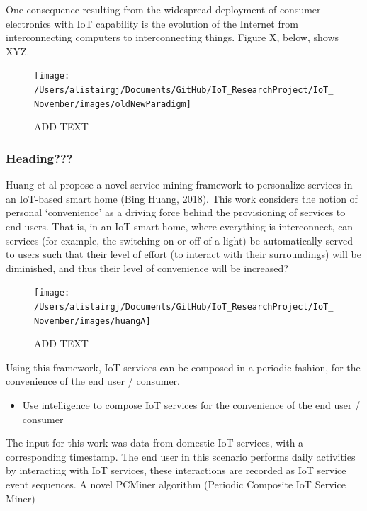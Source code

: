 \documentclass[11pt,]{article}
\providecommand{\tightlist}{%
  \setlength{\itemsep}{0pt}\setlength{\parskip}{0pt}}
\begin{document}
One consequence resulting from the widespread deployment of consumer
electronics with IoT capability is the evolution of the Internet from
interconnecting computers to interconnecting things. Figure X, below,
shows XYZ.

\begin{figure}[H]

{\centering \texttt{[image: /Users/alistairgj/Documents/GitHub/IoT\_ResearchProject/IoT\_November/images/oldNewParadigm]} 

}

\caption{ADD TEXT}\label{fig:unnamed-chunk-9}
\end{figure}

\hypertarget{heading}{%
\subsubsection{Heading???}\label{heading}}

Huang et al propose a novel service mining framework to personalize
services in an IoT-based smart home (Bing Huang, 2018). This work
considers the notion of personal `convenience' as a driving force behind
the provisioning of services to end users. That is, in an IoT smart
home, where everything is interconnect, can services (for example, the
switching on or off of a light) be automatically served to users such
that their level of effort (to interact with their surroundings) will be
diminished, and thus their level of convenience will be increased?

\begin{figure}[H]

{\centering \texttt{[image: /Users/alistairgj/Documents/GitHub/IoT\_ResearchProject/IoT\_November/images/huangA]} 

}

\caption{ADD TEXT}\label{fig:unnamed-chunk-10}
\end{figure}

Using this framework, IoT services can be composed in a periodic
fashion, for the convenience of the end user / consumer.

\begin{itemize}
\tightlist
\item
  Use intelligence to compose IoT services for the convenience of the
  end user / consumer
\end{itemize}

The input for this work was data from domestic IoT services, with a
corresponding timestamp. The end user in this scenario performs daily
activities by interacting with IoT services, these interactions are
recorded as IoT service event sequences. A novel PCMiner algorithm
(Periodic Composite IoT Service Miner)
\end{document}
